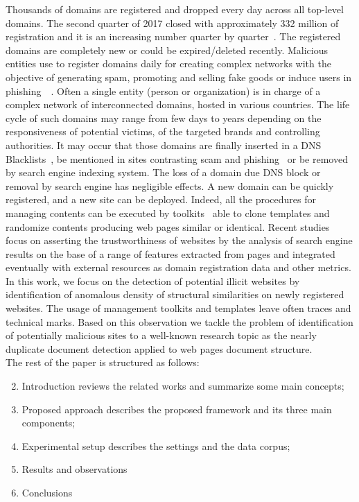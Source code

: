 \documentclass{easychair}
\begin{document}
Thousands of domains are registered and dropped every day across all top-level domains. The second quarter of 2017 closed with approximately 332 million of registration and it is an increasing number quarter by quarter~\cite{dnib}. The registered domains are completely new or could be expired/deleted recently. Malicious entities use to register domains daily for creating complex networks with the objective of generating spam, promoting and selling fake goods or induce users in phishing~\cite{Cova:2008:NFP:1496702.1496706}~\cite{europol}. 
Often a single entity (person or organization) is in charge of a complex network of interconnected domains, hosted in various countries. The life cycle of such domains may range from few days to years depending on the responsiveness of potential victims, of the targeted brands and controlling authorities.  It may occur that those domains are finally inserted in a DNS Blacklists~\cite{opendns}, be mentioned in sites contrasting scam and phishing~\cite{phishtank} or be removed by search engine indexing system. The loss of a domain due DNS block or removal by search engine has negligible effects. A new domain can be quickly registered, and a new site can be deployed. Indeed, all the procedures for managing contents can be executed by toolkits~\cite{blackhat} able to clone templates and randomize contents producing web pages similar or identical. Recent studies~\cite{Carpineto:2017:LDM:3106426.3106441}~\cite{Wadleigh:2015:EML:2736277.2741658} focus on asserting the trustworthiness of websites by the analysis of search engine results on the base of a range of features extracted from pages and integrated eventually with external resources as domain registration data and other metrics.
In this work, we focus on the detection of potential illicit websites by identification of anomalous density of structural similarities on newly registered websites. The usage of management toolkits and templates leave often traces and technical marks. Based on this observation we tackle the problem of identification of potentially malicious sites to a well-known research topic as the nearly duplicate document detection applied to web pages document structure. 
\\
The rest of the paper is structured as follows:

\begin{enumerate}
\setcounter{enumi}{1}
\item
Introduction reviews the related works and summarize some main concepts;

\item
Proposed approach describes the proposed framework and its three main components;

\item
Experimental setup describes the settings and the data corpus;

\item
Results and observations

\item
Conclusions 

\end{enumerate}
\end{document}
